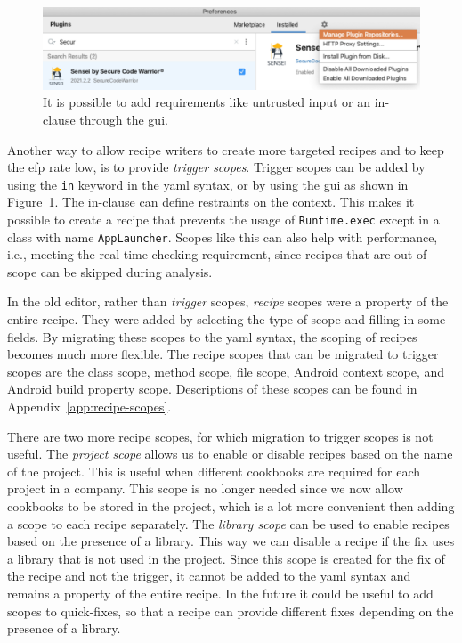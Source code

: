 \begin{figure}[t]
  \centering
  \includegraphics[width=\textwidth,page=9]{04-tools/figures/figures2.pdf}
  \caption[\Gls{gui} to add the requirement of untrusted input.]{It is possible to add requirements like untrusted input or an in-clause through the \gls{gui}.}
  \label{fig:recipegui}
\end{figure}

Another way to allow recipe writers to create more targeted recipes and to keep the \gls{efp} rate low, is to provide \emph{trigger scopes}.
Trigger scopes can be added by using the \texttt{in} keyword in the \gls{yaml} syntax, or by using the \gls{gui} as shown in Figure~\ref{fig:recipegui}.
The in-clause can define restraints on the context.
This makes it possible to create a recipe that prevents the usage of \texttt{Runtime.exec} except in a class with name \texttt{AppLauncher}.
Scopes like this can also help with performance, i.e., meeting the real-time checking requirement, since recipes that are out of scope can be skipped during analysis.

In the old editor, rather than \emph{trigger} scopes, \emph{recipe} scopes were a property of the entire recipe.
They were added by selecting the type of scope and filling in some fields.
By migrating these scopes to the \gls{yaml} syntax, the scoping of recipes becomes much more flexible.
The recipe scopes that can be migrated to trigger scopes are the class scope, method scope, file scope, Android context scope, and Android build property scope.
Descriptions of these scopes can be found in Appendix~\ref{app:recipe-scopes}.

There are two more recipe scopes, for which migration to trigger scopes is not useful.
The \emph{project scope} allows us to enable or disable recipes based on the name of the project.
This is useful when different cookbooks are required for each project in a company.
This scope is no longer needed since we now allow cookbooks to be stored in the project, which is a lot more convenient then adding a scope to each recipe separately.
The \emph{library scope} can be used to enable recipes based on the presence of a library.
This way we can disable a recipe if the fix uses a library that is not used in the project.
Since this scope is created for the fix of the recipe and not the trigger, it cannot be added to the \gls{yaml} syntax and remains a property of the entire recipe.
In the future it could be useful to add scopes to quick-fixes, so that a recipe can provide different fixes depending on the presence of a library.

